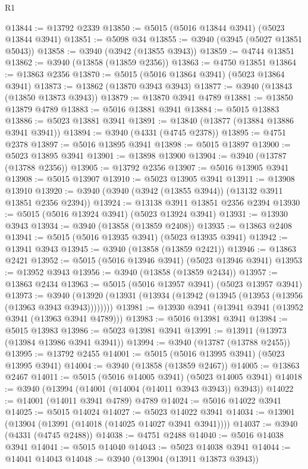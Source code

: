 \begin{lexlean}{R1}
\begin{coremodule}
@13844 := @13792 @2339
@13850 := @5015 (@5016 @13844 @3941) (@5023 @13844 @3941)
@13851 := @5098 @34
@13855 := @3940 (@3945 (@5027 @13851 @5043))
@13858 := @3940 (@3942 (@13855 @3943))
@13859 := @4744 @13851
@13862 := @3940 (@13858 (@13859 @2356))
@13863 := @4750 @13851
@13864 := @13863 @2356
@13870 := @5015 (@5016 @13864 @3941) (@5023 @13864 @3941)
@13873 := @13862 (@13870 @3943 @3943)
@13877 := @3940 (@13843 (@13850 @13873 @3943))
@13879 := @13870 @3941 @4789
@13881 := @13850 @13879 @4789
@13883 := @5016 @13881 @3941
@13884 := @5015 @13883
@13886 := @5023 @13881 @3941
@13891 := @13840 (@13877 (@13884 @13886 @3941 @3941))
@13894 := @3940 (@4331 (@4745 @2378))
@13895 := @4751 @2378
@13897 := @5016 @13895 @3941
@13898 := @5015 @13897
@13900 := @5023 @13895 @3941
@13901 := @13898 @13900
@13904 := @3940 (@13787 (@13788 @2356))
@13905 := @13792 @2356
@13907 := @5016 @13905 @3941
@13908 := @5015 @13907
@13910 := @5023 @13905 @3941
@13911 := @13908 @13910
@13920 := @3940 (@3940 (@3942 (@13855 @3944)) (@13132 @3911 @13851 @2356 @2394))
@13924 := @13138 @3911 @13851 @2356 @2394
@13930 := @5015 (@5016 @13924 @3941) (@5023 @13924 @3941)
@13931 := @13930 @3943
@13934 := @3940 (@13858 (@13859 @2408))
@13935 := @13863 @2408
@13941 := @5015 (@5016 @13935 @3941) (@5023 @13935 @3941)
@13942 := @13941 @3943
@13945 := @3940 (@13858 (@13859 @2421))
@13946 := @13863 @2421
@13952 := @5015 (@5016 @13946 @3941) (@5023 @13946 @3941)
@13953 := @13952 @3943
@13956 := @3940 (@13858 (@13859 @2434))
@13957 := @13863 @2434
@13963 := @5015 (@5016 @13957 @3941) (@5023 @13957 @3941)
@13973 := @3940 (@13920 (@13931 (@13934 (@13942 (@13945 (@13953 (@13956 (@13963 @3943 @3943))))))))
@13981 := @13930 @3941 (@13941 @3941 (@13952 @3941 (@13963 @3941 @4789)))
@13983 := @5016 @13981 @3941
@13984 := @5015 @13983
@13986 := @5023 @13981 @3941
@13991 := @13911 (@13973 (@13984 @13986 @3941 @3941))
@13994 := @3940 (@13787 (@13788 @2455))
@13995 := @13792 @2455
@14001 := @5015 (@5016 @13995 @3941) (@5023 @13995 @3941)
@14004 := @3940 (@13858 (@13859 @2467))
@14005 := @13863 @2467
@14011 := @5015 (@5016 @14005 @3941) (@5023 @14005 @3941)
@14018 := @3940 (@13994 (@14001 (@14004 (@14011 @3943 @3943)) @3943))
@14022 := @14001 (@14011 @3941 @4789) @4789
@14024 := @5016 @14022 @3941
@14025 := @5015 @14024
@14027 := @5023 @14022 @3941
@14034 := @13901 (@13904 (@13991 (@14018 (@14025 @14027 @3941 @3941))))
@14037 := @3940 (@4331 (@4745 @2488))
@14038 := @4751 @2488
@14040 := @5016 @14038 @3941
@14041 := @5015 @14040
@14043 := @5023 @14038 @3941
@14044 := @14041 @14043
@14048 := @3940 (@13904 (@13911 @13873 @3943))

\end{coremodule}
\end{lexlean}
